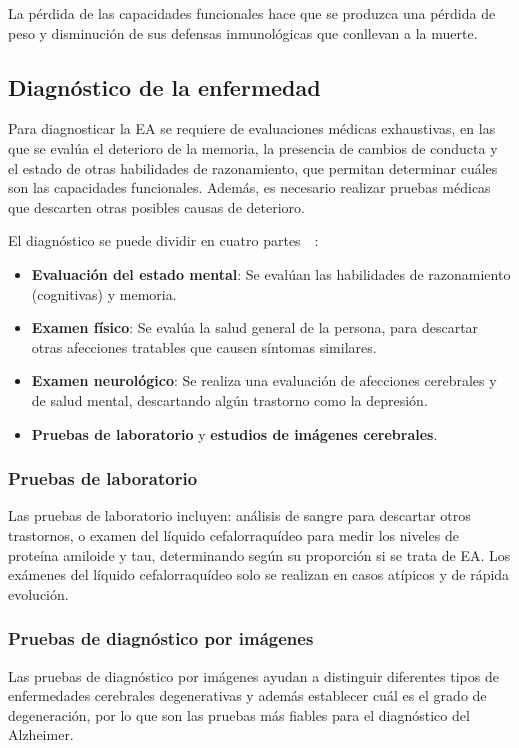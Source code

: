 La pérdida de las capacidades funcionales hace que se produzca una pérdida de peso y disminución de sus defensas
inmunológicas que conllevan a la muerte.

\subsection{Diagnóstico de la enfermedad}\label{subsec:diagnostico-enfermedad}
Para diagnosticar la EA se requiere de evaluaciones médicas exhaustivas, en las que se evalúa el deterioro de la memoria,
la presencia de cambios de conducta y el estado de otras habilidades de razonamiento, que permitan determinar cuáles son
las capacidades funcionales.
Además, es necesario realizar pruebas médicas que descarten otras posibles causas de deterioro.

El diagnóstico se puede dividir en cuatro partes~\cite{mayo-clinic-diagnostico,alz-org-diagnostico}~:
\begin{itemize}
    \item \textbf{Evaluación del estado mental}: Se evalúan las habilidades de razonamiento (cognitivas) y memoria.
    \item \textbf{Examen físico}: Se evalúa la salud general de la persona, para descartar otras afecciones tratables
    que causen síntomas similares.
    \item \textbf{Examen neurológico}: Se realiza una evaluación de afecciones cerebrales y de salud mental, descartando
    algún trastorno como la depresión.
    \item \textbf{Pruebas de laboratorio} y \textbf{estudios de imágenes cerebrales}.\\
\end{itemize}

\subsubsection{Pruebas de laboratorio}\label{subsubsec:pruebas-laboratorio-EA}
Las pruebas de laboratorio incluyen: análisis de sangre para descartar otros trastornos, o examen del líquido
cefalorraquídeo para medir los niveles de proteína amiloide y tau, determinando según su proporción si se trata de EA.
Los exámenes del líquido cefalorraquídeo solo se realizan en casos atípicos y de rápida evolución.

\subsubsection{Pruebas de diagnóstico por imágenes}\label{subsubsec:pruebas-imagenes-EA}
Las pruebas de diagnóstico por imágenes ayudan a distinguir diferentes tipos de enfermedades cerebrales degenerativas y
además establecer cuál es el grado de degeneración, por lo que son las pruebas más fiables para el diagnóstico del
Alzheimer.

